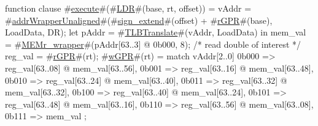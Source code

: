 function clause #\hyperref[zexecute]{execute}#(#\hyperref[zLDR]{LDR}#(base, rt, offset)) =
  {
    vAddr = #\hyperref[zaddrWrapperUnaligned]{addrWrapperUnaligned}#(#\hyperref[zsignzyextend]{sign\_extend}#(offset) + #\hyperref[zrGPR]{rGPR}#(base), LoadData, DR);
    let pAddr = #\hyperref[zTLBTranslate]{TLBTranslate}#(vAddr, LoadData) in
      {
        mem_val = #\hyperref[zMEMrzywrapper]{MEMr\_wrapper}#(pAddr[63..3] @ 0b000, 8); /* read double of interest */
        reg_val = #\hyperref[zrGPR]{rGPR}#(rt);
        #\hyperref[zwGPR]{wGPR}#(rt)  = match vAddr[2..0]
              {
                0b000  => reg_val[63..08] @ mem_val[63..56],
                0b001  => reg_val[63..16] @ mem_val[63..48],
                0b010  => reg_val[63..24] @ mem_val[63..40],
                0b011  => reg_val[63..32] @ mem_val[63..32],
                0b100  => reg_val[63..40] @ mem_val[63..24],
                0b101  => reg_val[63..48] @ mem_val[63..16],
                0b110  => reg_val[63..56] @ mem_val[63..08],
                0b111  => mem_val
              };
      }
  }
